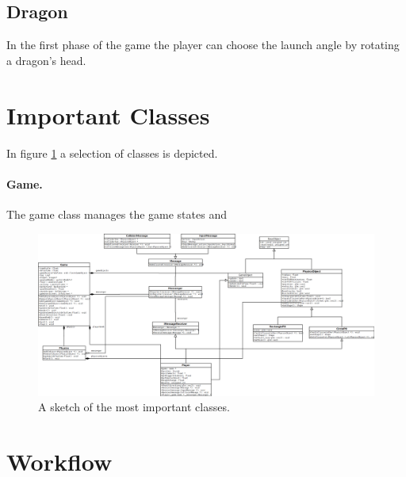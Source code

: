 \documentclass[12pt]{article}
\begin{document}
\subsection{Dragon}

In the first phase of the game the player can choose the launch angle by rotating a dragon's head.

\section{Important Classes}
\label{section:classes}

In figure \ref{figure:classes} a selection of classes is depicted.

\paragraph{Game.}
The game class manages the game states and 

\begin{figure}[H]
	\centering
	\includegraphics[totalheight=0.5\textheight, angle=90]{classes.png}
	\caption{A sketch of the most important classes.}
	\label{figure:classes}
\end{figure}

\section{Workflow}
\label{section:workflow}

\newpage
\lstlistoflistings
\listoffigures
\end{document}
